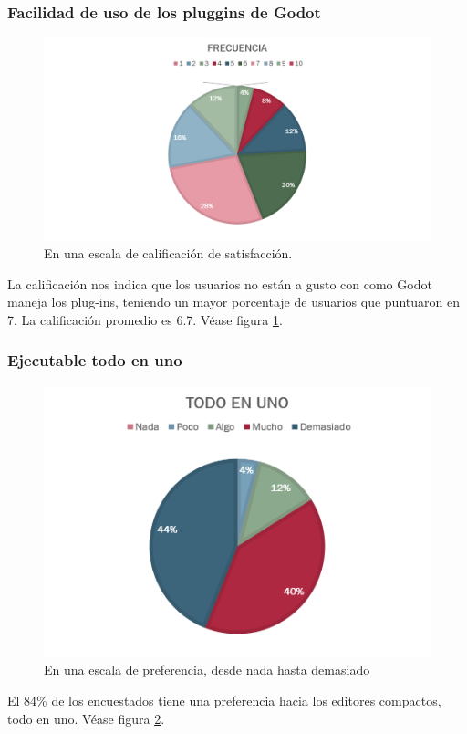 \documentclass[]{article}
\begin{document}
\subsubsection{Facilidad de uso de los pluggins de Godot}
\begin{figure}[H]
	
	\centering
	\includegraphics[width=1\textwidth]{Encuesta_facilidad_pluggins}
	\caption{En una escala de calificaci\'on de satisfacci\'on.} 
	\label{PLUG}
	
\end{figure}
La calificaci\'on nos indica que los usuarios no est\'an a gusto con como Godot maneja los plug-ins, teniendo un mayor porcentaje de usuarios que puntuaron en 7. La calificaci\'on promedio es 6.7. V\'ease figura \ref{PLUG}.
\subsubsection{Ejecutable todo en uno}
\begin{figure}[H]
	
	\centering
	\includegraphics[width=1\textwidth]{Encuesta_facilidad_todoenuno}
	\caption{En una escala de preferencia, desde nada hasta demasiado} 
	\label{ALLINONE}
	
\end{figure}
El 84\% de los encuestados tiene una preferencia hacia los editores compactos, todo en uno. V\'ease figura \ref{ALLINONE}.
\end{document}
